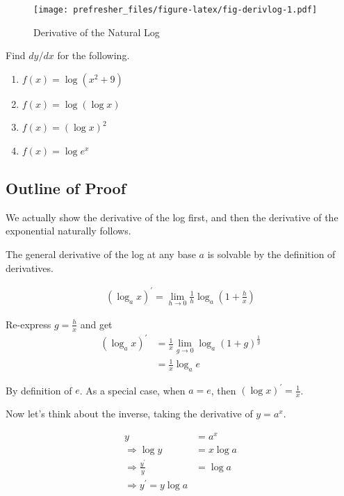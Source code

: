 \documentclass[]{book}
\providecommand{\tightlist}{%
  \setlength{\itemsep}{0pt}\setlength{\parskip}{0pt}}
\theoremstyle{definition}
\theoremstyle{definition}
\theoremstyle{definition}
\theoremstyle{remark}
\let\BeginKnitrBlock\begin \let\EndKnitrBlock\end
\begin{document}
\begin{figure}
\centering
\texttt{[image: prefresher\_files/figure-latex/fig-derivlog-1.pdf]}
\caption{\label{fig:fig-derivlog}Derivative of the Natural Log}
\end{figure}

\BeginKnitrBlock{example}[Derivative of logs]
\protect\hypertarget{exm:exmderivlog}{}{\label{exm:exmderivlog} {} }Find \(dy/dx\) for the following.

\begin{enumerate}
\def\labelenumi{\arabic{enumi}.}
\tightlist
\item
  \(f(x)=\log(x^2+9)\)
\item
  \(f(x)=\log(\log x)\)
\item
  \(f(x)=(\log x)^2\)
\item
  \(f(x)=\log e^x\)
\end{enumerate}
\EndKnitrBlock{example}

\hypertarget{outline-of-proof}{%
\subsection*{Outline of Proof}\label{outline-of-proof}}

We actually show the derivative of the log first, and then the derivative of the exponential naturally follows.

The general derivative of the log at any base \(a\) is solvable by the definition of derivatives.

\begin{align*}
(\log_a x)^\prime = \lim\limits_{h\to 0} \frac{1}{h}\log_{a}\left(1 + \frac{h}{x}\right)
\end{align*}

Re-express \(g = \frac{h}{x}\) and get
\begin{align*}
(\log_a x)^\prime &= \frac{1}{x}\lim_{g\to 0}\log_{a} (1 + g)^{\frac{1}{g}}\\
&= \frac{1}{x}\log_a e
\end{align*}

By definition of \(e\). As a special case, when \(a = e\), then \((\log x)^\prime = \frac{1}{x}\).

Now let's think about the inverse, taking the derivative of \(y = a^x\).

\begin{align*}
y &= a^x \\
\Rightarrow \log y &= x \log a\\
\Rightarrow \frac{y^\prime}{y} &= \log a\\
\Rightarrow  y^\prime = y \log a\\
\end{align*}
\end{document}
